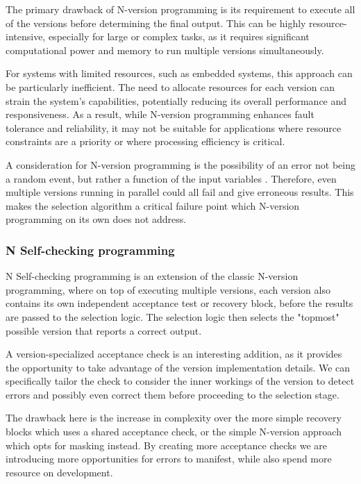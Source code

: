 The primary drawback of N-version programming is its requirement to execute all of the versions before determining the final output. This can be highly resource-intensive, especially for large or complex tasks, as it requires significant computational power and memory to run multiple versions simultaneously.

For systems with limited resources, such as embedded systems, this approach can be particularly inefficient. The need to allocate resources for each version can strain the system's capabilities, potentially reducing its overall performance and responsiveness. As a result, while N-version programming enhances fault tolerance and reliability, it may not be suitable for applications where resource constraints are a priority or where processing efficiency is critical.

A consideration for N-version programming is the possibility of an error not being a random event, but rather a function of the input variables \cite{5326}. Therefore, even multiple versions running in parallel could all fail and give erroneous results. This makes the selection algorithm a critical failure point which N-version programming on its own does not address.

\subsubsection{N Self-checking programming}

N Self-checking programming is an extension of the classic N-version programming, where on top of executing multiple versions, each version also contains its own independent acceptance test or recovery block, before the results are passed to the selection logic. The selection logic then selects the "topmost" possible version that reports a correct output.

A version-specialized acceptance check is an interesting addition, as it provides the opportunity to take advantage of the version implementation details. We can specifically tailor the check to consider the inner workings of the version to detect errors and possibly even correct them before proceeding to the selection stage.

The drawback here is the increase in complexity over the more simple recovery blocks which uses a shared acceptance check, or the simple N-version approach which opts for masking instead. By creating more acceptance checks we are introducing more opportunities for errors to manifest, while also spend more resource on development.


